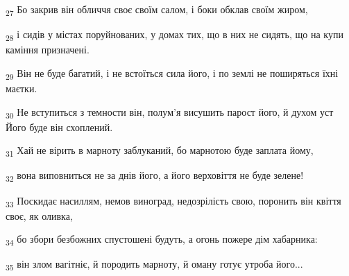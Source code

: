 \begin{tcolorbox}
\textsubscript{27} Бо закрив він обличчя своє своїм салом, і боки обклав своїм жиром,
\end{tcolorbox}
\begin{tcolorbox}
\textsubscript{28} і сидів у містах поруйнованих, у домах тих, що в них не сидять, що на купи каміння призначені.
\end{tcolorbox}
\begin{tcolorbox}
\textsubscript{29} Він не буде багатий, і не встоїться сила його, і по землі не поширяться їхні маєтки.
\end{tcolorbox}
\begin{tcolorbox}
\textsubscript{30} Не вступиться з темности він, полум'я висушить парост його, й духом уст Його буде він схоплений.
\end{tcolorbox}
\begin{tcolorbox}
\textsubscript{31} Хай не вірить в марноту заблуканий, бо марнотою буде заплата йому,
\end{tcolorbox}
\begin{tcolorbox}
\textsubscript{32} вона виповниться не за днів його, а його верховіття не буде зелене!
\end{tcolorbox}
\begin{tcolorbox}
\textsubscript{33} Поскидає насиллям, немов виноград, недозрілість свою, поронить він квіття своє, як оливка,
\end{tcolorbox}
\begin{tcolorbox}
\textsubscript{34} бо збори безбожних спустошені будуть, а огонь пожере дім хабарника:
\end{tcolorbox}
\begin{tcolorbox}
\textsubscript{35} він злом вагітніє, й породить марноту, й оману готує утроба його...
\end{tcolorbox}
